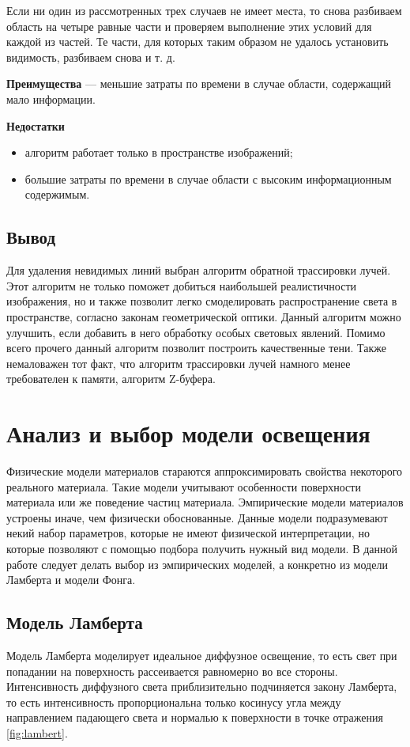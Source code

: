 Если ни один из рассмотренных трех случаев не имеет места, то снова разбиваем область на четыре равные части и проверяем выполнение этих условий для каждой из частей. Те части, для которых таким образом не удалось установить видимость, разбиваем снова и т. д. 

\textbf{Преимущества} --- меньшие затраты по времени в случае области, содержащий мало информации. 

\textbf{Недостатки}
\begin{itemize}[label=---]
	\item алгоритм работает только в пространстве изображений;
	\item большие затраты по времени в случае области с высоким информационным содержимым. 
\end{itemize}

\subsection*{Вывод}
 
Для удаления невидимых линий выбран алгоритм обратной трассировки лучей. Этот алгоритм не только поможет добиться наибольшей реалистичности изображения, но и также позволит легко смоделировать распространение света в пространстве, согласно законам геометрической оптики. Данный алгоритм можно улучшить, если добавить в него обработку особых световых явлений. Помимо всего прочего данный алгоритм позволит построить качественные тени. Также немаловажен тот факт, что алгоритм трассировки лучей намного менее требователен к памяти, алгоритм Z-буфера.

\section{Анализ и выбор модели освещения}
Физические модели материалов стараются аппроксимировать свойства некоторого реального материала. Такие модели учитывают особенности поверхности материала или же поведение частиц материала. Эмпирические модели материалов устроены иначе, чем физически обоснованные. Данные модели подразумевают некий набор параметров, которые не имеют физической интерпретации, но которые позволяют с помощью подбора получить нужный вид модели. В данной работе следует делать выбор из эмпирических моделей, а конкретно из модели Ламберта и модели Фонга. 

\subsection{Модель Ламберта}
Модель Ламберта моделирует идеальное диффузное освещение, то есть свет при попадании на поверхность рассеивается равномерно во все стороны.
Интенсивность диффузного света приблизительно подчиняется закону Ламберта, то есть интенсивность пропорциональна только косинусу угла между направлением падающего света и нормалью к поверхности в точке отражения \ref{fig:lambert}. 

